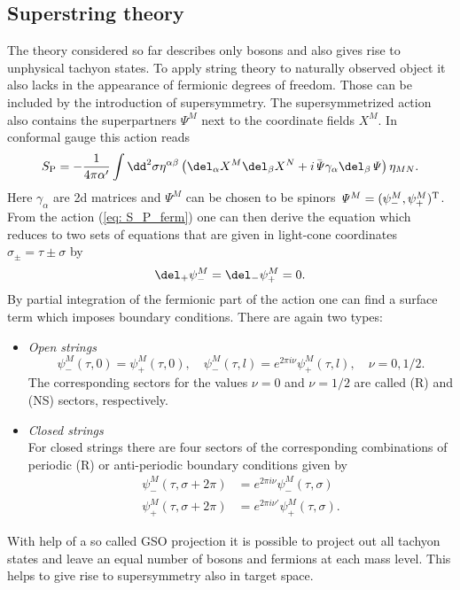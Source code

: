 \subsection{Superstring theory}
The theory considered so far describes only bosons and also gives rise to unphysical tachyon states. To apply string theory to naturally observed object it also lacks in the appearance of fermionic degrees of freedom. Those can be included by the introduction of supersymmetry. The supersymmetrized  action also contains the superpartners $\mathit{\Psi}^{M}$ next to the coordinate fields $X^{M}$. In conformal gauge this action reads
%
%
\begin{equation}
S_{\rm P} = -\frac{1}{4\pi\alpha'} \int \dd^{2}\sigma \eta^{\alpha\beta}\left( \del_{\alpha}X^{M}\del_{\beta}X^{N} + i \bar{\mathit{\Psi}} \gamma_{\alpha} \del_{\beta} \mathit{\Psi} \right) \eta_{MN}.
\label{eq: S_P_ferm}
\end{equation}
%
%
Here $\gamma_{\alpha}$ are 2d  matrices and $\mathit{\Psi}^{M}$ can be chosen to be  spinors $\mathit{\Psi}^{M}=(\psi_{-}^{M},\psi_{+}^{M})^{\rm T}$. From the action (\ref{eq: S_P_ferm}) one can then derive the  equation which reduces to two sets of  equations that are given in light-cone coordinates $\sigma_{\pm}=\tau \pm \sigma$ by
%
%
\begin{equation}
\del_{+}\psi_{-}^{M} = \del_{-}\psi_{+}^{M} = 0.
\end{equation}
%
%
By partial integration of the fermionic part of the action one can find a surface term which imposes boundary conditions. There are again two types:
%
%
\begin{itemize}
\item\textit{Open strings}
\begin{equation}
\psi_{-}^{M}(\tau,0)=\psi_{+}^{M}(\tau,0),\quad \psi_{-}^{M}(\tau,l)=e^{2\pi i \nu} \psi_{+}^{M}(\tau,l),\quad \nu=0,1/2.
\end{equation}
%
The corresponding sectors for the values $\nu=0$ and $\nu=1/2$ are called  (R) and  (NS) sectors, respectively.
%
%
\item\textit{Closed strings}\\
For closed strings there are four sectors of the corresponding combinations of periodic (R) or anti-periodic boundary conditions given by
%
\begin{equation}
\begin{alignedat}{2}
\psi_{-}^{M}(\tau,\sigma+2\pi) &= e^{2\pi i \nu}\psi_{-}^{M}(\tau,\sigma) \\
\psi_{+}^{M}(\tau,\sigma+2\pi) &= e^{2\pi i \nu'}\psi_{+}^{M}(\tau,\sigma) .
\end{alignedat}
\end{equation}
\end{itemize}
%
%
With help of a so called GSO projection it is possible to project out all tachyon states and leave an equal number of bosons and fermions at each mass level. This helps to give rise to supersymmetry also in target space.
%
%
%
%
%
%
%
%
